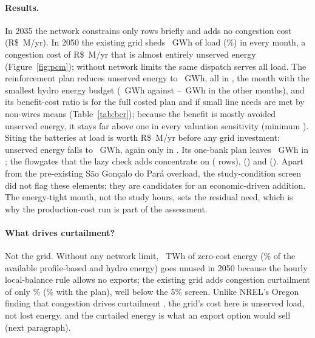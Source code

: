 \documentclass[10pt]{article}
\newcommand{\RS}{R\$}
\begin{document}
\paragraph{Results.} In 2035 the network constrains only \Nrowsaexistinggrid{} rows briefly and adds no congestion cost
(\RS\Ncongaexistinggrid~M/yr). In 2050 the existing grid sheds \Nensbexistinggrid~GWh of load (\Nenspctbexistinggrid\%) in every month,
a congestion cost of \RS\Ncongbexistinggrid~M/yr that is almost entirely unserved energy (Figure~\ref{fig:pcm}); without network limits
the same dispatch serves all load. The reinforcement plan reduces unserved energy to \Nensbwithplan~GWh, all in \Nbudgetminmonth, the month with the
smallest hydro energy budget (\Nbudgetmin~GWh against \Nbudgetothermin--\Nbudgetothermax~GWh in the other months), and its benefit-cost ratio is \NbcrRfull{} for the full costed plan and \NbcrRexcl{} if small line needs are met by
non-wires means (Table~\ref{tab:bcr}); because the benefit is mostly avoided unserved energy, it stays far above one in every valuation
sensitivity (minimum \NbcrRmin). Siting the batteries at load is worth \RS\Nbenreloc~M/yr before any grid investment: unserved energy falls
to \Nensbbessatloadexistinggrid~GWh, again only in \Nbudgetminmonth. Its one-bank plan leaves \Nensbbessatloadwithplan~GWh in
\Nbudgetminmonth; the flowgates that the lazy check adds concentrate on \Nfgbalplanone{} (\Nfgbalplanrowsone{} rows), \Nfgbalplantwo{}
(\Nfgbalplanrowstwo) and \Nfgbalplanthree{} (\Nfgbalplanrowsthree). Apart from the pre-existing S\~ao Gon\c{c}alo do Par\'a overload, the
study-condition screen did not flag these elements; they are candidates for an economic-driven addition. The energy-tight month, not the study hours, sets the residual
need, which is why the production-cost run is part of the assessment.

\paragraph{What drives curtailment?} Not the grid. Without any network limit, \Nunusedbcopperplate~TWh of zero-cost energy
(\Nunusedpctbcopperplate\% of the available profile-based and hydro energy) goes unused in 2050 because the hourly local-balance rule
allows no exports; the existing grid adds congestion curtailment of only \Ncongcurtpctbexistinggrid\% (\Ncongcurtpctbwithplan\% with the plan), well below
the 5\% screen. Unlike NREL's Oregon finding that congestion drives curtailment \citep{nrel2021oregon}, the grid's cost here is
unserved load, not lost energy, and the curtailed energy is what an export option would sell (next paragraph).
\end{document}
